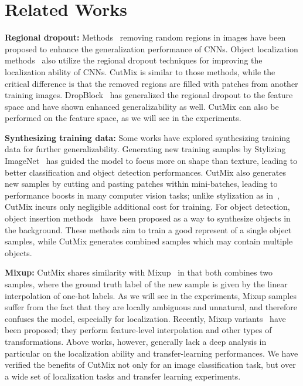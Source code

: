 

\section{Related Works}

\noindent\textbf{Regional dropout: }
Methods~\cite{devries2017cutout,zhong2017randomerase} removing random regions in images have been proposed to enhance the generalization performance of CNNs. 
Object localization methods~\cite{singh2017hide,choe2019attention} also utilize the regional dropout techniques for improving the localization ability of CNNs.
CutMix is similar to those methods, while the critical difference is that the removed regions are filled with patches from another training images.
DropBlock~\cite{ghiasi2018dropblock} has generalized the regional dropout to the feature space and have shown enhanced generalizability as well. 
CutMix can also be performed on the feature space, as we will see in the experiments.


\noindent\textbf{Synthesizing training data: }
Some works have explored synthesizing training data for further generalizability.
Generating new training samples by Stylizing ImageNet~\cite{ImageNet,geirhos2018imagenet_stylize} has guided the model to focus more on shape than texture, leading to better classification and object detection performances. 
CutMix also generates new samples by cutting and pasting patches within mini-batches, leading to performance boosts in many computer vision tasks; unlike stylization as in~\cite{geirhos2018imagenet_stylize}, CutMix incurs only negligible additional cost for training.
For object detection, object insertion methods~\cite{dwibedi2017cut_paste_learn, dvornik2018modeling} have been proposed as a way to synthesize objects in the background.
These methods aim to train a good represent of a single object samples, while CutMix generates combined samples which may contain multiple objects.

\noindent\textbf{Mixup: }
CutMix shares similarity with Mixup~\cite{zhang2017mixup, tokozume2018betweenclass} in that both combines two samples, where the ground truth label of the new sample is given by the linear interpolation of one-hot labels. 
As we will see in the experiments, Mixup samples suffer from the fact that they are locally ambiguous and {unnatural}, and therefore confuses the model, especially for localization.
Recently, Mixup variants~\cite{verma2018manifoldmixup, summers2019improvedm, guo2018adamix, takahashi2018ricap} have been proposed; they perform feature-level interpolation and other types of transformations.
Above works, however, generally lack a deep analysis in particular on the localization ability and transfer-learning performances.
We have verified the benefits of CutMix not only for an image classification task, but over a wide set of localization tasks and transfer learning experiments. 

